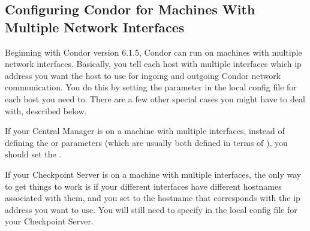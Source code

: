 \subsection{\label{sec:Multiple-Interfaces}Configuring Condor for
Machines With Multiple Network Interfaces } 

Beginning with Condor version 6.1.5, Condor can run on machines with
multiple network interfaces.
Basically, you tell each host with multiple interfaces which ip
address you want the host to use for ingoing and outgoing Condor
network communication.
You do this by setting the  parameter in
the local config file for each host you need to.
There are a few other special cases you might have to deal with,
described below.

If your Central Manager is on a machine with multiple interfaces,
instead of defining the  or
 parameters (which are usually both defined in
terms of ), you should set the . 

If your Checkpoint Server is on a machine with multiple interfaces,
the only way to get things to work is if your different interfaces
have different hostnames associated with them, and you set
 to the hostname that corresponds with the
ip address you want to use.  
You will still need to specify  in the local
config file for your Checkpoint Server.

